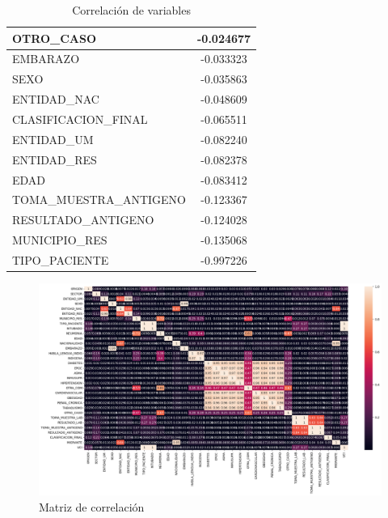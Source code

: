 \begin{table}[h]
{\begin{tabular}{|l|c|}
OTRO\_CASO                         & -0.024677         \\ \hline
EMBARAZO                           & -0.033323         \\ \hline
SEXO                               & -0.035863         \\ \hline
ENTIDAD\_NAC                       & -0.048609         \\ \hline
CLASIFICACION\_FINAL               & -0.065511         \\ \hline
ENTIDAD\_UM                        & -0.082240         \\ \hline
ENTIDAD\_RES                       & -0.082378         \\ \hline
EDAD                               & -0.083412         \\ \hline
TOMA\_MUESTRA\_ANTIGENO            & -0.123367         \\ \hline
RESULTADO\_ANTIGENO                & -0.124028         \\ \hline
MUNICIPIO\_RES                     & -0.135068         \\ \hline
TIPO\_PACIENTE                     & -0.997226         \\ \hline
\end{tabular}
}
\caption{Correlación de variables}
\label{tabla:autores}
\end{table}


\clearpage
\begin{figure}[h]
	\centering
	\includegraphics[scale=.4] {img/a-correlacion}
	\caption{Matriz de correlación}
	\label{fig:0}	
\end{figure}

\clearpage
 